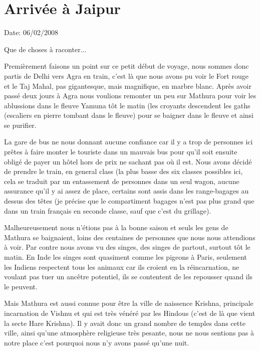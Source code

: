 \section{Arrivée à Jaipur}

Date: 06/02/2008

\begin{multicols}{2}

Que de choses à raconter...

Premièrement faisons un point sur ce petit début de voyage, nous sommes donc partis de Delhi vers Agra en train, c'est là que nous avons pu voir le Fort rouge et le Taj Mahal, pas gigantesque, mais magnifique, en marbre blanc. Après avoir passé deux jours à Agra nous voulions remonter un peu sur Mathura pour voir les ablussions dans le fleuve Yamuna tôt le matin (les croyants descendent les gaths (escaliers en pierre tombant dans le fleuve) pour se baigner dans le fleuve et ainsi se purifier.

La gare de bus ne nous donnant aucune confiance car il y a trop de personnes ici prêtes à faire monter le touriste dans un mauvais bus pour qu'il soit ensuite obligé de payer un hôtel hors de prix ne sachant pas où il est. Nous avons décidé de prendre le train, en general class (la plus basse des six classes possibles ici, cela se traduit par un entassement de personnes dans un seul wagon, aucune assurance qu'il y ai assez de place, certains sont assis dans les range-bagages au dessus des têtes (je précise que le compartiment bagages n'est pas plus grand que dans un train français en seconde classe, sauf que c'est du grillage).

Malheureusement nous n'étions pas à la bonne saison et seuls les gens de Mathura se baignaient, loins des centaines de personnes que nous nous attendions à voir. Par contre nous avons vu des singes, des singes de partout, surtout tôt le matin. En Inde les singes sont quasiment comme les pigeons à Paris, seulement les Indiens respectent tous les animaux car ils croient en la réincarnation, ne voulant pas tuer un ancêtre potentiel, ils se contentent de les repousser quand ils le peuvent.

Mais Mathura est aussi connue pour être la ville de naissence Krishna, principale incarnation de Vishnu et qui est très vénéré par les Hindous (c'est de là que vient la secte Hare Krishna). Il y avait donc un grand nombre de temples dans cette ville, ainsi qu'une atmosphère religieuse très pesante, nous ne nous sentions pas à notre place c'est pourquoi nous n'y avons passé qu'une nuit.


\end{multicols}
